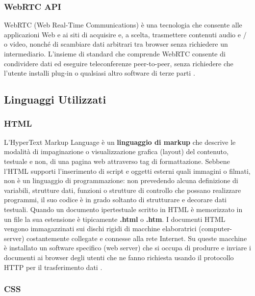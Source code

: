 \subsubsection{WebRTC API}
WebRTC (Web Real-Time Communications) è una tecnologia che consente alle applicazioni Web e ai siti di acquisire e, a scelta, trasmettere contenuti audio e / o video, nonché di scambiare dati arbitrari tra browser senza richiedere un intermediario. L'insieme di standard che comprende WebRTC consente di condividere dati ed eseguire teleconferenze peer-to-peer, senza richiedere che l'utente installi plug-in o qualsiasi altro software di terze parti \cite{sito_WebRTC_API} \cite{sito_WebRTC_esempi}.

\newpage

\subsection{Linguaggi Utilizzati}
\subsubsection{HTML}
L'HyperText Markup Language è un \textbf{linguaggio di markup} che descrive le modalità di impaginazione o visualizzazione grafica (layout) del contenuto, testuale e non, di una pagina web attraverso tag di formattazione. Sebbene l'HTML supporti l'inserimento di script e oggetti esterni quali immagini o filmati, non è un linguaggio di programmazione: non prevedendo alcuna definizione di variabili, strutture dati, funzioni o strutture di controllo che possano realizzare programmi, il suo codice è in grado soltanto di strutturare e decorare dati testuali.
Quando un documento ipertestuale scritto in HTML è memorizzato in un file la sua estensione è tipicamente \textbf{.html} o \textbf{.htm}.
I documenti HTML vengono immagazzinati sui dischi rigidi di macchine elaboratrici (computer-server) costantemente collegate e connesse alla rete Internet. Su queste macchine è installato un software specifico (web server) che si occupa di produrre e inviare i documenti ai browser degli utenti che ne fanno richiesta usando il protocollo HTTP per il trasferimento dati \cite{sito_HTML}.

\subsubsection{CSS}


